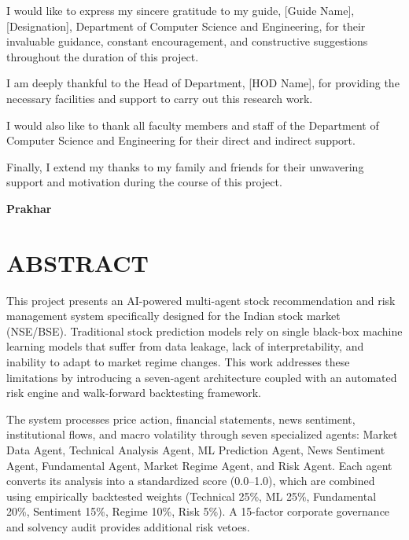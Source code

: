 \documentclass[12pt,a4paper]{report}
\begin{document}
\noindent I would like to express my sincere gratitude to my guide, [Guide Name], [Designation], Department of Computer Science and Engineering, for their invaluable guidance, constant encouragement, and constructive suggestions throughout the duration of this project.

I am deeply thankful to the Head of Department, [HOD Name], for providing the necessary facilities and support to carry out this research work.

I would also like to thank all faculty members and staff of the Department of Computer Science and Engineering for their direct and indirect support.

Finally, I extend my thanks to my family and friends for their unwavering support and motivation during the course of this project.

\vspace{2cm}

\begin{flushright}
    \textbf{Prakhar} \\
    [Roll Number]
\end{flushright}

\newpage
{}
\setcounter{page}{1}
\chapter*{ABSTRACT}

This project presents an AI-powered multi-agent stock recommendation and risk management system specifically designed for the Indian stock market (NSE/BSE). Traditional stock prediction models rely on single black-box machine learning models that suffer from data leakage, lack of interpretability, and inability to adapt to market regime changes. This work addresses these limitations by introducing a seven-agent architecture coupled with an automated risk engine and walk-forward backtesting framework.

The system processes price action, financial statements, news sentiment, institutional flows, and macro volatility through seven specialized agents: Market Data Agent, Technical Analysis Agent, ML Prediction Agent, News Sentiment Agent, Fundamental Agent, Market Regime Agent, and Risk Agent. Each agent converts its analysis into a standardized score (0.0--1.0), which are combined using empirically backtested weights (Technical 25\%, ML 25\%, Fundamental 20\%, Sentiment 15\%, Regime 10\%, Risk 5\%). A 15-factor corporate governance and solvency audit provides additional risk vetoes.
\end{document}
